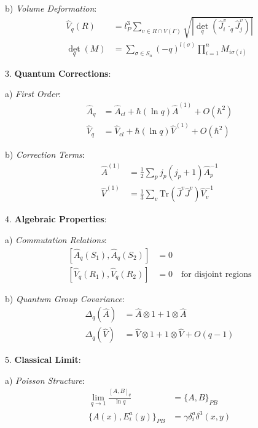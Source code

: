 \documentclass[12pt,a4paper]{article}
\begin{document}
   b) \textit{Volume Deformation}:
      \[
      \begin{aligned}
      \hat{V}_q(R) &= l_P^3 \sum_{v \in R \cap V(\Gamma)} \sqrt{|\det_q(\hat{J}_i^v \cdot_q \hat{J}_j^v)|} \\
      \det_q(M) &= \sum_{\sigma \in S_n} (-q)^{l(\sigma)}\prod_{i=1}^n M_{i\sigma(i)}
      \end{aligned}
      \]

3. \textbf{Quantum Corrections}:
   
   a) \textit{First Order}:
      \[
      \begin{aligned}
      \hat{A}_q &= \hat{A}_{cl} + \hbar(\ln q)\hat{A}^{(1)} + O(\hbar^2) \\
      \hat{V}_q &= \hat{V}_{cl} + \hbar(\ln q)\hat{V}^{(1)} + O(\hbar^2)
      \end{aligned}
      \]
   
   b) \textit{Correction Terms}:
      \[
      \begin{aligned}
      \hat{A}^{(1)} &= \frac{1}{2}\sum_{p} j_p(j_p+1)\hat{A}_p^{-1} \\
      \hat{V}^{(1)} &= \frac{1}{3}\sum_{v} \text{Tr}(\hat{J}^v\hat{J}^v)\hat{V}_v^{-1}
      \end{aligned}
      \]

4. \textbf{Algebraic Properties}:
   
   a) \textit{Commutation Relations}:
      \[
      \begin{aligned}
      [\hat{A}_q(S_1), \hat{A}_q(S_2)] &= 0 \\
      [\hat{V}_q(R_1), \hat{V}_q(R_2)] &= 0 \quad \text{for disjoint regions}
      \end{aligned}
      \]
   
   b) \textit{Quantum Group Covariance}:
      \[
      \begin{aligned}
      \Delta_q(\hat{A}) &= \hat{A} \otimes 1 + 1 \otimes \hat{A} \\
      \Delta_q(\hat{V}) &= \hat{V} \otimes 1 + 1 \otimes \hat{V} + O(q-1)
      \end{aligned}
      \]

5. \textbf{Classical Limit}:
   
   a) \textit{Poisson Structure}:
      \[
      \begin{aligned}
      \lim_{q \to 1}\frac{[A,B]_q}{\ln q} &= \{A,B\}_{PB} \\
      \{A(x),E^a_i(y)\}_{PB} &= \gamma\delta^a_i\delta^3(x,y)
      \end{aligned}
      \]
   
\end{document}

